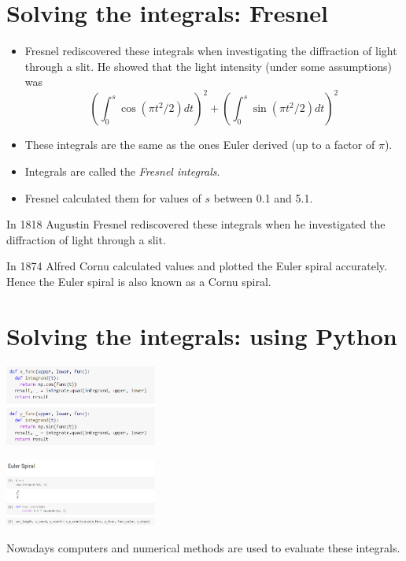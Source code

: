 \documentclass[12pt]{article} %
\theoremstyle{definition}
\theoremstyle{theorem}
\begin{document}
\section{Solving the integrals: Fresnel}
\begin{tcolorbox}
	\begin{itemize}
		\item Fresnel rediscovered these integrals when investigating the diffraction of light through a slit. He showed that the light intensity (under some assumptions) was 
		\[
		\left( \int_{0}^{s}\cos \left( \pi t^2 / 2 \right) dt \right) ^2 + 
		\left( \int_{0}^{s}\sin \left( \pi t^2 / 2 \right) dt \right) ^2
		\] 
		\item These integrals are the same as the ones Euler derived (up to a factor of $\pi$).
		\item Integrals are called the \emph{Fresnel integrals}.
		\item Fresnel calculated them for values of $s$ between 0.1 and 5.1.
	\end{itemize}
\end{tcolorbox}

In 1818 Augustin Fresnel rediscovered these integrals when he investigated the diffraction of light through a slit. 

In 1874 Alfred Cornu calculated values and plotted the Euler spiral accurately. Hence the Euler spiral is also known as a Cornu spiral.


\section{Solving the integrals: using Python}
\begin{tcolorbox}
	\includegraphics[width=50mm, scale=0.5]{code_1.png}	
			
	\includegraphics[width=50mm, scale=0.5]{code_2.png}
	
	Nowadays computers and numerical methods are used to evaluate these integrals.
\end{tcolorbox}
\end{document}
